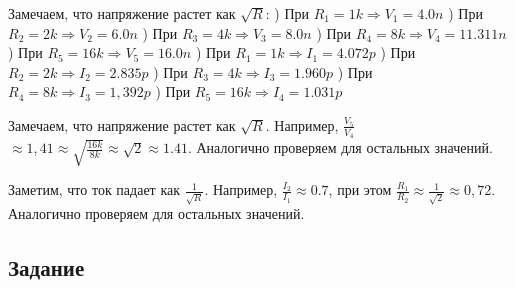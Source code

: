 \documentclass[a4paper, 14pt]{extarticle}%
\begin{document}
Замечаем, что напряжение растет как $\sqrt{R}$:
) При $R_1 = 1k \Rightarrow  V_1 = 4.0n$
) При $R_2 = 2k \Rightarrow  V_2 = 6.0n$
) При $R_3 = 4k \Rightarrow  V_3 = 8.0n$
) При $R_4 = 8k \Rightarrow  V_4 = 11.311n$
) При $R_5 = 16k \Rightarrow  V_5 = 16.0n$
) При $R_1 = 1k \Rightarrow  I_1 = 4.072p$
) При $R_2 = 2k \Rightarrow  I_2 = 2.835p$
) При $R_3 = 4k \Rightarrow  I_3 = 1.960p$
) При $R_4 = 8k \Rightarrow  I_3 = 1,392p$
) При $R_5 = 16k \Rightarrow  I_4 = 1.031p$
\newline

Замечаем, что напряжение растет как $\sqrt{R}$.
Например, $\frac{V_5}{V_4}$ $\approx 1,41 \approx \sqrt{\frac{16k}{8k}} \approx \sqrt{2} \approx 1.41$. Аналогично проверяем для остальных значений.


Заметим, что ток падает как $\frac{1}{\sqrt{R}}$.
Например, $\frac{I_2}{I_1} \approx 0.7$, при этом $\frac{R_1}{R_2} \approx \frac{1}{\sqrt{2}} \approx 0,72$. Аналогично проверяем для остальных значений.


\subsection{Задание}
\end{document}
